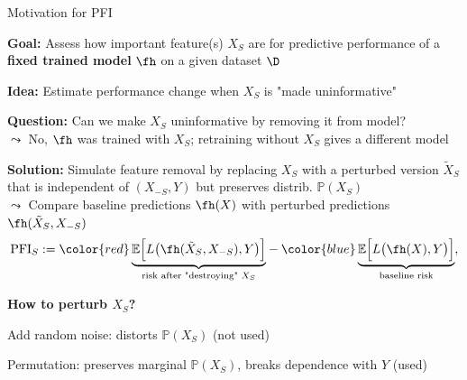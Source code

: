 \documentclass[10pt,compress,t,notes=noshow, xcolor=table]{beamer}
\begin{document}








\begin{framei}[align=top]{Motivation for PFI}
\item<1-> \textbf{Goal:} Assess how important feature(s) $X_S$ are for predictive performance of a \textbf{fixed trained model} $\fh$ on a given dataset $\D$
\item<1-> \textbf{Idea:} Estimate performance change when $X_S$ is "made uninformative"
\item<2-> \textbf{Question:} Can we make $X_S$ uninformative by removing it from model?\\
$\leadsto$ No, $\fh$ was trained with $X_S$; retraining without $X_S$ gives a different model
\item<3->
\textbf{Solution:} Simulate feature removal by replacing $X_S$ with a perturbed version $\tilde{X}_S$ that is independent of $(X_{-S}, Y)$ but preserves distrib. $\mathbb{P}(X_S)$\\
$\leadsto$ Compare {\color{blue}baseline predictions $\fh(X)$} with {\color{red}perturbed predictions $\fh(\tilde{X}_S, X_{-S})$}
$$
\text{PFI}_S :=
{\color{red}\underbrace{\mathbb{E}\Big[L\big(\fh(\tilde{X}_S, X_{-S}), Y\big)\Big]}_{\text{risk after "destroying" }X_S}}
-
{\color{blue}\underbrace{\mathbb{E}\Big[L\big(\fh(X), Y\big)\Big]}_{\text{baseline risk}}},
$$
\item<3-> \textbf{How to perturb $X_S$?}
\begin{itemizeS}
\item Add random noise: distorts $\mathbb{P}(X_S)$ (not used)
\item Permutation: preserves marginal $\mathbb{P}(X_S)$, breaks dependence with $Y$ (used)
\end{itemizeS}
\end{framei}
\end{document}
